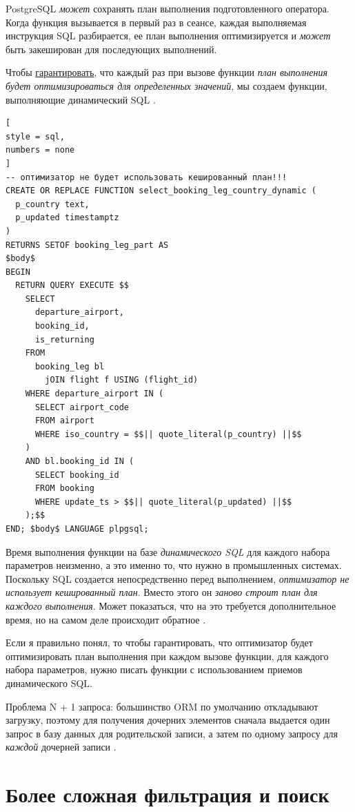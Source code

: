 \documentclass[%
	11pt,
	a4paper,
	utf8,
		]{article}
\begin{document}
PostgreSQL \emph{может} сохранять план выполнения подготовленного оператора. Когда функция вызывается в первый раз в сеансе, каждая выполняемая инструкция SQL разбирается, ее план выполнения оптимизируется и \emph{может} быть закеширован для последующих выполнений.

Чтобы \underline{гарантировать}, что каждый раз при вызове функции \emph{план выполнения будет оптимизироваться для определенных значений}, мы создаем функции, выполняющие динамический SQL \cite[]{dombrovskaya:postgresql-2022}.

\begin{lstlisting}[
style = sql,
numbers = none	
]
-- оптимизатор не будет использовать кешированный план!!!
CREATE OR REPLACE FUNCTION select_booking_leg_country_dynamic (
  p_country text,
  p_updated timestamptz
)
RETURNS SETOF booking_leg_part AS
$body$
BEGIN
  RETURN QUERY EXECUTE $$
    SELECT
      departure_airport,
      booking_id,
      is_returning
    FROM
      booking_leg bl 
        jOIN flight f USING (flight_id)
    WHERE departure_airport IN (
      SELECT airport_code
      FROM airport
      WHERE iso_country = $$|| quote_literal(p_country) ||$$
    )
    AND bl.booking_id IN (
      SELECT booking_id
      FROM booking
      WHERE update_ts > $$|| quote_literal(p_updated) ||$$
    );$$
END; $body$ LANGUAGE plpgsql;
\end{lstlisting}

Время выполнения функции на базе \emph{динамического SQL} для каждого набора параметров неизменно, а это именно то, что нужно в промышленных системах. Поскольку SQL создается непосредственно перед выполнением, \emph{оптимизатор не использует кешированный план}. Вместо этого он \emph{заново строит план для каждого выполнения}. Может показаться, что на это требуется дополнительное время, но на самом деле происходит обратное \cite[]{dombrovskaya:postgresql-2022}.

Если я правильно понял, то чтобы гарантировать, что оптимизатор будет оптимизировать план выполнения при каждом вызове функции, для каждого набора параметров, нужно писать функции с использованием приемов динамического SQL.

Проблема N + 1 запроса: большинство ORM по умолчанию откладывают загрузку, поэтому для получения дочерних элементов сначала выдается один запрос в базу данных для родительской записи, а затем по одному запросу для \emph{каждой} дочерней записи \cite[]{dombrovskaya:postgresql-2022}.

\section{Более сложная фильтрация и поиск}
\end{document}
